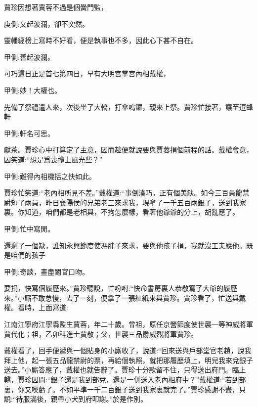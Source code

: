 \begin{parag}
    賈珍因想著賈蓉不過是個黌門監，\begin{note}庚側:又起波瀾，卻不突然。\end{note}靈幡經榜上寫時不好看，便是執事也不多，因此心下甚不自在。\begin{note}甲側:善起波瀾。\end{note}可巧這日正是首七第四日，早有大明宮掌宮內相戴權，\begin{note}甲側:妙！大權也。\end{note}先備了祭禮遣人來，次後坐了大轎，打傘嗚鑼，親來上祭。賈珍忙接著，讓至逗蜂軒\begin{note}甲側:軒名可思。\end{note}獻茶。賈珍心中打算定了主意，因而趁便就說要與賈蓉捐個前程的話。戴權會意，因笑道:“想是爲喪禮上風光些？”\begin{note}甲側:難得內相機括之快如此。\end{note}賈珍忙笑道:“老內相所見不差。”戴權道:“事倒湊巧，正有個美缺。如今三百員龍禁尉短了兩員，昨日襄陽侯的兄弟老三來求我，現拿了一千五百兩銀子，送到我家裏。你知道，咱們都是老相與，不拘怎麼樣，看著他爺爺的分上，胡亂應了。\begin{note}甲側:忙中寫閒。\end{note}還剩了一個缺，誰知永興節度使馮胖子來求，要與他孩子捐，我就沒工夫應他。既是咱們的孩子\begin{note}甲側:奇談，畫盡閹官口吻。\end{note}要捐，快寫個履歷來。”賈珍聽說，忙吩咐:“快命書房裏人恭敬寫了大爺的履歷來。”小廝不敢怠慢，去了一刻，便拿了一張紅紙來與賈珍。賈珍看了，忙送與戴權。看時，上面寫道:
\end{parag}


\begin{qute2sp}
    江南江寧府江寧縣監生賈蓉，年二十歲。曾祖，原任京營節度使世襲一等神威將軍賈代化；祖，乙卯科進士賈敬；父，世襲三品爵威烈將軍賈珍。
\end{qute2sp}


\begin{parag}
    戴權看了，回手便遞與一個貼身的小廝收了，說道:“回來送與戶部堂官老趙，說我拜上他，起一張五品龍禁尉的票，再給個執照，就把那履歷填上，明兒我來兌銀子送去。”小廝答應了，戴權也就告辭了。賈珍十分款留不住，只得送出府門。臨上轎，賈珍因問:“銀子還是我到部兌，還是一併送入老內相府中？”戴權道:“若到部裏，你又喫虧了。不如平準一千二百銀子送到我家裏就完了。”賈珍感謝不盡，只說:“待服滿後，親帶小犬到府叩謝。”於是作別。
\end{parag}


